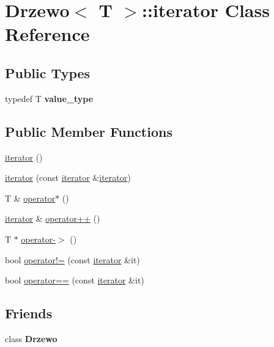 \hypertarget{class_drzewo_1_1iterator}{}\section{Drzewo$<$ T $>$\+:\+:iterator Class Reference}
\label{class_drzewo_1_1iterator}
\subsection*{Public Types}
\begin{DoxyCompactItemize}
\item 
\mbox{\label{class_drzewo_1_1iterator_a7ba4387023d41aafa83791b42fc5b5ee}} 
typedef T {\bfseries value\+\_\+type}
\end{DoxyCompactItemize}
\subsection*{Public Member Functions}
\begin{DoxyCompactItemize}
\item 
\hyperlink{class_drzewo_1_1iterator_a279751514e51594342daa7a7ed501a38}{iterator} ()
\item 
\hyperlink{class_drzewo_1_1iterator_a627d8a55a11ad8be75493634c6fe07b2}{iterator} (const \hyperlink{class_drzewo_1_1iterator}{iterator} \&\hyperlink{class_drzewo_1_1iterator}{iterator})
\item 
T \& \hyperlink{class_drzewo_1_1iterator_ab2ee76d0390832e9bed32a829f08f328}{operator$\ast$} ()
\item 
\hyperlink{class_drzewo_1_1iterator}{iterator} \& \hyperlink{class_drzewo_1_1iterator_a8b67f4409ee4532a89e745744ba6f8b3}{operator++} ()
\item 
T $\ast$ \hyperlink{class_drzewo_1_1iterator_ac982660e25eb9720b5c81b6ccff0559e}{operator-\/$>$} ()
\item 
bool \hyperlink{class_drzewo_1_1iterator_a7bc726d05d85b2d7b2cd68f180237331}{operator!=} (const \hyperlink{class_drzewo_1_1iterator}{iterator} \&it)
\item 
bool \hyperlink{class_drzewo_1_1iterator_a552c4e6d4bb62519595329bc5cf32d98}{operator==} (const \hyperlink{class_drzewo_1_1iterator}{iterator} \&it)
\end{DoxyCompactItemize}
\subsection*{Friends}
\begin{DoxyCompactItemize}
\item 
\mbox{\label{class_drzewo_1_1iterator_a1c4e4c3515fb1b999118d69c354d7efd}} 
class {\bfseries Drzewo}
\end{DoxyCompactItemize}


